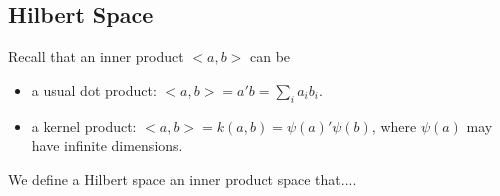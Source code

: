 \subsection{Hilbert Space}
Recall that an inner product $<a,b>$ can be
\begin{itemize}
    \item a usual dot product: $<a,b>=a'b=\sum_i a_i b_i$.
    \item a kernel product: $<a,b>=k(a,b)=\psi(a)'\psi(b)$, where $\psi(a)$ may have infinite dimensions.
\end{itemize} 
We define a Hilbert space an inner product space that....
